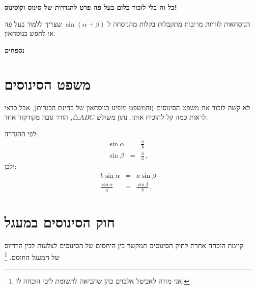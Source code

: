 \documentclass[12pt,a4paper]{article}
\begin{document}
\textbf{\large
כל זה בלי לזכור כלום בעל פה פרט להגדרות של סינוס וקוסינוס!
}

\bigskip

הנןסחאות לזוויות מרובות מתקבלות בקלות מהנוסחה ל 
$\sin(\alpha+\beta)$
שצריך ללמוד בעל פה או לחפש בנוסחאון.


\appendix
\newpage

\begin{center}
\textbf{\Large נספחים}
\end{center}

\section{משפט הסינוסים}

לא קשה לזכור את משפט הסינוסים )והמשפט מופיע בנוסחאון של בחינת הבגרות(, אבל כדאי לראות כמה קל להוכיח אותו. נתון משולש
$\triangle ABC$,
הורד גובה מקודקוד אחד:
\begin{center}
\end{center}
לפי ההגדרה:
\begin{eqnarray*}
\sin\alpha &=& \frac{h}{b}\\
\sin\beta &=& \frac{h}{a}\,,
\end{eqnarray*}
ולכן:
\begin{eqnarray*}
b\sin\alpha &=& a\sin\beta\\
\frac{\sin\alpha}{a} &=& \frac{\sin\beta}{b}\,.
\end{eqnarray*}


\section{חוק הסינוסים במעגל}

קיימת הוכחה אחרת לחוק הסינוסים המקשר בין היחסים של הסינוסים לצלעות לבין הרדיוס של המעגל החוסם.%
\footnote{אני מודה לאביטל אלבוים כהן שהביאה לתשומת ליבי הוכחה לו.}
\end{document}
